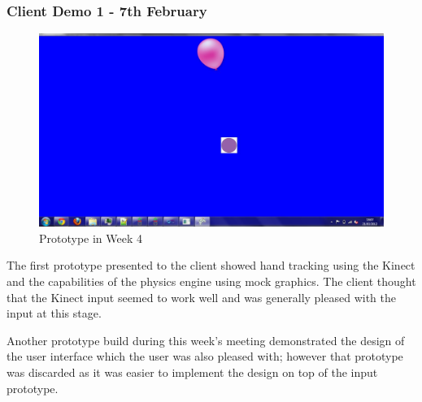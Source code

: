 \subsubsection{Client Demo 1 - 7th February}
\begin{figure}[h]
\begin{centering}
\includegraphics[width=\textwidth]{Diagrams/Client-Log-W4.jpg}
\par\end{centering}

\caption{Prototype in Week 4}
\end{figure}
The first prototype presented to the client showed hand tracking using the
Kinect and the capabilities of the physics engine using mock graphics. The
client thought that the Kinect input seemed to work well and was generally
pleased with the input at this stage.

Another prototype build during this week's meeting demonstrated the design of
the user interface which the user was also pleased with; however that prototype
was discarded as it was easier to implement the design on top of the input
prototype.

\clearpage{}
